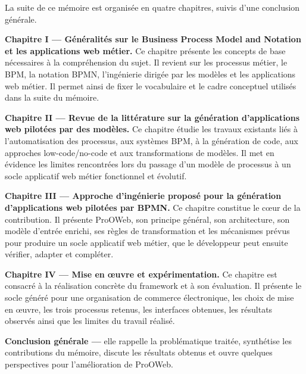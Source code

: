 La suite de ce mémoire est organisée en quatre chapitres, suivis d'une conclusion générale.

\textbf{Chapitre I — Généralités sur le Business Process Model and Notation et les applications web métier.} Ce chapitre présente les concepts de base nécessaires à la compréhension du sujet. Il revient sur les processus métier, le BPM, la notation BPMN, l'ingénierie dirigée par les modèles et les applications web métier. Il permet ainsi de fixer le vocabulaire et le cadre conceptuel utilisés dans la suite du mémoire.

\textbf{Chapitre II — Revue de la littérature sur la génération d'applications web pilotées par des modèles.} Ce chapitre étudie les travaux existants liés à l'automatisation des processus, aux systèmes BPM, à la génération de code, aux approches low-code/no-code et aux transformations de modèles. Il met en évidence les limites rencontrées lors du passage d'un modèle de processus à un socle applicatif web métier fonctionnel et évolutif.

\textbf{Chapitre III — Approche d'ingénierie proposé pour la génération d'applications web pilotées par BPMN.} Ce chapitre constitue le cœur de la contribution. Il présente ProOWeb, son principe général, son architecture, son modèle d'entrée enrichi, ses règles de transformation et les mécanismes prévus pour produire un socle applicatif web métier, que le développeur peut ensuite vérifier, adapter et compléter.

\textbf{Chapitre IV — Mise en œuvre et expérimentation.} Ce chapitre est consacré à la réalisation concrète du framework et à son évaluation. Il présente le socle généré pour une organisation de commerce électronique, les choix de mise en œuvre, les trois processus retenus, les interfaces obtenues, les résultats observés ainsi que les limites du travail réalisé.

\textbf{Conclusion générale —} elle rappelle la problématique traitée, synthétise les contributions du mémoire, discute les résultats obtenus et ouvre quelques perspectives pour l'amélioration de ProOWeb.

\myCleanStarChapterEnd
